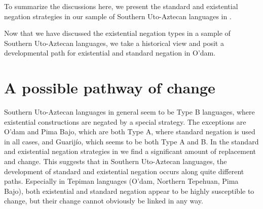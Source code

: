 \documentclass[output=paper,draft,draftmode,colorlinks,citecolor=brown]{langscibook}
\begin{document}
To summarize the discussions here, we present the standard and existential negation strategies in our sample of Southern Uto-Aztecan languages in . 

\begin{table}[t]
\caption{Negation strategies among Southern Uto-Aztecan languages}
\label{tab:odam-snenstrat}
\end{table}

Now that we have discussed the existential negation types in a sample of
Southern Uto-Aztecan languages, we take a historical view and posit a
developmental path for existential and standard negation in O'dam.%


\section{A possible pathway of change}
\label{sec:odam-protoexneg}
Southern Uto-Aztecan languages in general seem to be Type B languages, where existential constructions are negated by a special strategy. The exceptions are O'dam and Pima Bajo, which are both Type A, where standard negation is used in all cases, and Guarijío, which seems to be both Type A and B. In the standard and existential negation strategies in  we find a significant amount of replacement and change. This suggests that in Southern Uto-Aztecan languages, the development of standard and existential negation occurs along quite different paths. Especially in Tepiman languages (O'dam, Northern Tepehuan, Pima Bajo), both existential and standard negation appear to be highly susceptible to change, but their change cannot obviously be linked in any way.
\end{document}
